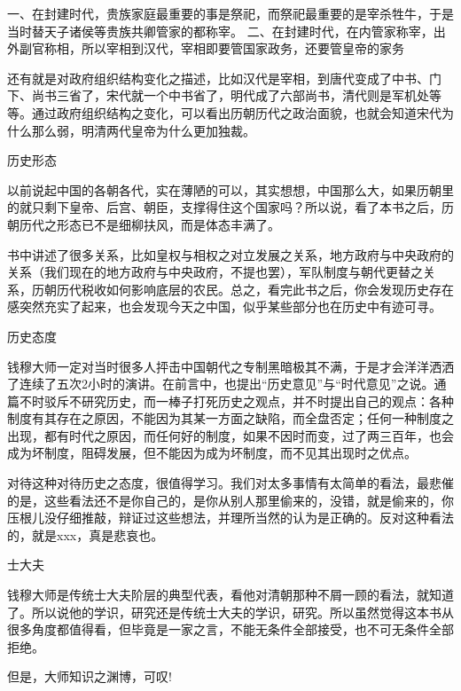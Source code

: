 一、在封建时代，贵族家庭最重要的事是祭祀，而祭祀最重要的是宰杀牲牛，于是当时替天子诸侯等贵族共卿管家的都称宰。
二、在封建时代，在内管家称宰，出外副官称相，所以宰相到汉代，宰相即要管国家政务，还要管皇帝的家务

还有就是对政府组织结构变化之描述，比如汉代是宰相，到唐代变成了中书、门下、尚书三省了，宋代就一个中书省了，明代成了六部尚书，清代则是军机处等等。通过政府组织结构之变化，可以看出历朝历代之政治面貌，也就会知道宋代为什么那么弱，明清两代皇帝为什么更加独裁。

历史形态

以前说起中国的各朝各代，实在薄陋的可以，其实想想，中国那么大，如果历朝里的就只剩下皇帝、后宫、朝臣，支撑得住这个国家吗？所以说，看了本书之后，历朝历代之形态已不是细柳扶风，而是体态丰满了。

书中讲述了很多关系，比如皇权与相权之对立发展之关系，地方政府与中央政府的关系（我们现在的地方政府与中央政府，不提也罢），军队制度与朝代更替之关系，历朝历代税收如何影响底层的农民。总之，看完此书之后，你会发现历史存在感突然充实了起来，也会发现今天之中国，似乎某些部分也在历史中有迹可寻。

历史态度

钱穆大师一定对当时很多人抨击中国朝代之专制黑暗极其不满，于是才会洋洋洒洒了连续了五次2小时的演讲。在前言中，也提出“历史意见”与“时代意见”之说。通篇不时驳斥不研究历史，而一棒子打死历史之观点，并不时提出自己的观点：各种制度有其存在之原因，不能因为其某一方面之缺陷，而全盘否定；任何一种制度之出现，都有时代之原因，而任何好的制度，如果不因时而变，过了两三百年，也会成为坏制度，阻碍发展，但不能因为成为坏制度，而不见其出现时之优点。

对待这种对待历史之态度，很值得学习。我们对太多事情有太简单的看法，最悲催的是，这些看法还不是你自己的，是你从别人那里偷来的，没错，就是偷来的，你压根儿没仔细推敲，辩证过这些想法，并理所当然的认为是正确的。反对这种看法的，就是xxx，真是悲哀也。

士大夫

钱穆大师是传统士大夫阶层的典型代表，看他对清朝那种不屑一顾的看法，就知道了。所以说他的学识，研究还是传统士大夫的学识，研究。所以虽然觉得这本书从很多角度都值得看，但毕竟是一家之言，不能无条件全部接受，也不可无条件全部拒绝。

但是，大师知识之渊博，可叹!
